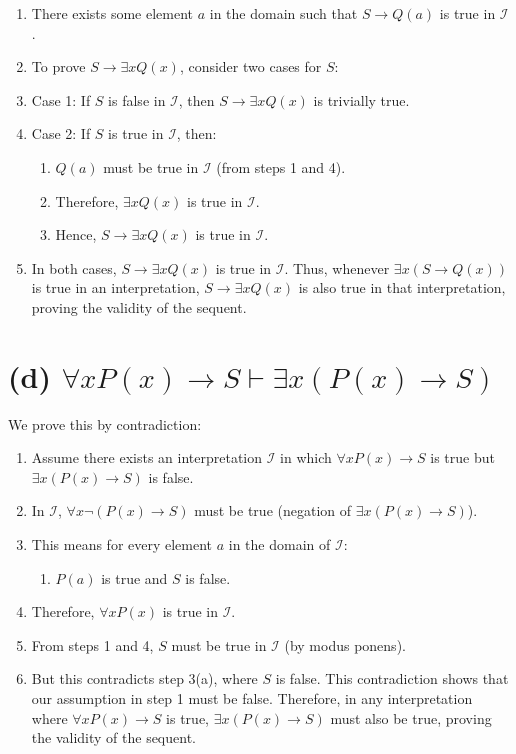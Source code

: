 \documentclass{article}
\newenvironment{proof}
{\begin{mdframed}[linewidth=0.5pt]\begin{enumerate}[label=\arabic*.,leftmargin=*]}
{\end{enumerate}\end{mdframed}}
\begin{document}
\begin{proof}
    \item There exists some element $a$ in the domain such that $S \to Q(a)$ is true in $\mathcal{I}$. \hfill
    \item To prove $S \to \exists xQ(x)$, consider two cases for $S$: \hfill
    \item Case 1: If $S$ is false in $\mathcal{I}$, then $S \to \exists xQ(x)$ is trivially true. \hfill
    \item Case 2: If $S$ is true in $\mathcal{I}$, then: \hfill
    \begin{enumerate}
        \item $Q(a)$ must be true in $\mathcal{I}$ (from steps 1 and 4). \hfill
        \item Therefore, $\exists xQ(x)$ is true in $\mathcal{I}$. \hfill
        \item Hence, $S \to \exists xQ(x)$ is true in $\mathcal{I}$. \hfill
    \end{enumerate}
    \item In both cases, $S \to \exists xQ(x)$ is true in $\mathcal{I}$. \hfill
Thus, whenever $\exists x(S \to Q(x))$ is true in an interpretation, $S \to \exists xQ(x)$ is also true in that interpretation, proving the validity of the sequent. \hfill
\end{proof}

\newpage
\section*{(d) $\forall xP(x) \to S \vdash \exists x(P(x) \to S)$}
    We prove this by contradiction:

\begin{proof}
    \item Assume there exists an interpretation $\mathcal{I}$ in which $\forall xP(x) \to S$ is true but $\exists x(P(x) \to S)$ is false. \hfill
    \item In $\mathcal{I}$, $\forall x\neg(P(x) \to S)$ must be true (negation of $\exists x(P(x) \to S)$). \hfill
    \item This means for every element $a$ in the domain of $\mathcal{I}$: \hfill
    \begin{enumerate}
        \item $P(a)$ is true and $S$ is false. \hfill
    \end{enumerate}
    \item Therefore, $\forall xP(x)$ is true in $\mathcal{I}$. \hfill
    \item From steps 1 and 4, $S$ must be true in $\mathcal{I}$ (by modus ponens). \hfill
    \item But this contradicts step 3(a), where $S$ is false. \hfill
This contradiction shows that our assumption in step 1 must be false. Therefore, in any interpretation where $\forall xP(x) \to S$ is true, $\exists x(P(x) \to S)$ must also be true, proving the validity of the sequent. \hfill
\end{proof}
\end{document}
